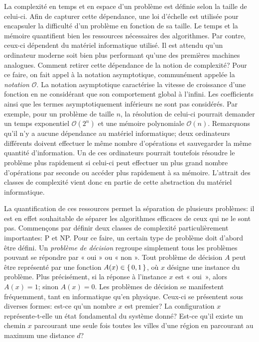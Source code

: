 La complexité en temps et en espace d'un problème est définie selon la taille de celui-ci. Afin de capturer cette dépendance, une loi d'échelle est utilisée pour encapsuler la difficulté d'un problème en fonction de sa taille. Le temps et la mémoire quantifient bien les ressources nécessaires des algorithmes. Par contre, ceux-ci dépendent du matériel informatique utilisé. Il est attendu qu'un ordinateur moderne soit bien plus performant qu'une des premières machines analogues. Comment retirer cette dépendance de la notion de complexité? Pour ce faire, on fait appel à la notation asymptotique, communément appelée la \textit{notation $\mathcal{O}$}. La notation asymptotique caractérise la vitesse de croissance d'une fonction en ne considérant que son comportement global à l'infini. Les coefficients ainsi que les termes asymptotiquement inférieurs ne sont pas considérés. Par exemple, pour un problème de taille $n$, la résolution de celui-ci pourrait demander un temps exponentiel $\mathcal{O}(2^{n})$ et une mémoire polynomiale $\mathcal{O}(n)$. Remarquons qu'il n'y a aucune dépendance au matériel informatique; deux ordinateurs différents doivent effectuer le même nombre d'opérations et sauvegarder la même quantité d'information. Un de ces ordinateurs pourrait toutefois résoudre le problème plus rapidement si celui-ci peut effectuer un plus grand nombre d'opérations par seconde ou accéder plus rapidement à sa mémoire. L'attrait des classes de complexité vient donc en partie de cette abstraction du matériel informatique.

La quantification de ces ressources permet la séparation de plusieurs problèmes: il est en effet souhaitable de séparer les algorithmes efficaces de ceux qui ne le sont pas. Commençons par définir deux classes de complexité particulièrement importantes: \textsf{P} et \textsf{NP}. Pour ce faire, un certain type de problème doit d'abord être défini. Un \textit{problème de décision} regroupe simplement tous les problèmes pouvant se répondre par « oui » ou « non ». Tout problème de décision $A$ peut être représenté par une fonction $A(x) \in \set{ 0, 1 }$, où $x$ désigne une instance du problème. Plus précisément, si la réponse à l'instance $x$ est « oui », alors $A(x)=1$; sinon $A(x)=0$. Les problèmes de décision se manifestent fréquemment, tant en informatique qu'en physique. Ceux-ci se présentent sous diverses formes: est-ce qu'un nombre $x$ est premier? La configuration $x$ représente-t-elle un état fondamental du système donné? Est-ce qu'il existe un chemin $x$ parcourant une seule fois toutes les villes d'une région en parcourant au maximum une distance $d$?

